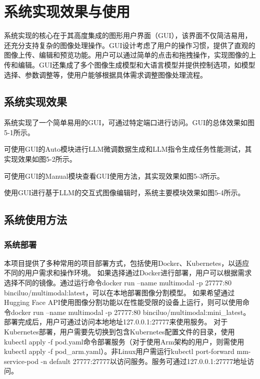 \documentclass[a4paper,AutoFakeBold,oneside,12pt]{book}
\begin{document}
\chapter{系统实现效果与使用} %
系统实现的核心在于其高度集成的图形用户界面（GUI），该界面不仅简洁易用，还充分支持复杂的图像处理操作。GUI设计考虑了用户的操作习惯，提供了直观的图像上传、编辑和预览功能。用户可以通过简单的点击和拖拽操作，实现图像的上传和编辑。GUI还集成了多个图像生成模型和大语言模型并提供控制选项，如模型选择、参数调整等，使用户能够根据具体需求调整图像处理流程。
\section{系统实现效果}
系统实现了一个简单易用的GUI，可通过特定端口进行访问。GUI的总体效果如图5-1所示。

可使用GUI的Auto模块进行LLM微调数据生成和LLM指令生成任务性能测试，其实现效果如图5-2所示。

可使用GUI的Manual模块查看GUI使用方法，其实现效果如图5-3所示。

使用GUI进行基于LLM的交互式图像编辑时，系统主要模块效果如图5-4所示。

\section{系统使用方法}
\subsection{系统部署}
本项目提供了多种常用的项目部署方式，包括使用Docker、Kubernetes，以适应不同的用户需求和操作环境。
如果选择通过Docker进行部署，用户可以根据需求选择不同的镜像。通过运行命令docker run --name multimodal -p 27777:80 binciluo/multimodal:latest，可以在本地部署图像分割模型。
如果希望通过Hugging Face API使用图像分割功能以在性能受限的设备上运行，则可以使用命令docker run --name multimodal -p 27777:80 binciluo/multimodal:mini\_latest。
部署完成后，用户可通过访问本地地址127.0.0.1:27777来使用服务。
对于Kubernetes部署，用户需要先切换到包含Kubernetes配置文件的目录，使用kubectl apply -f pod.yaml命令部署服务（对于使用Arm架构的用户，则需使用kubectl apply -f pod\_arm.yaml）。非Linux用户需运行kubectl port-forward mm-service-pod -n default 27777:27777以访问服务。服务可通过127.0.0.1:27777地址访问。
\end{document}

